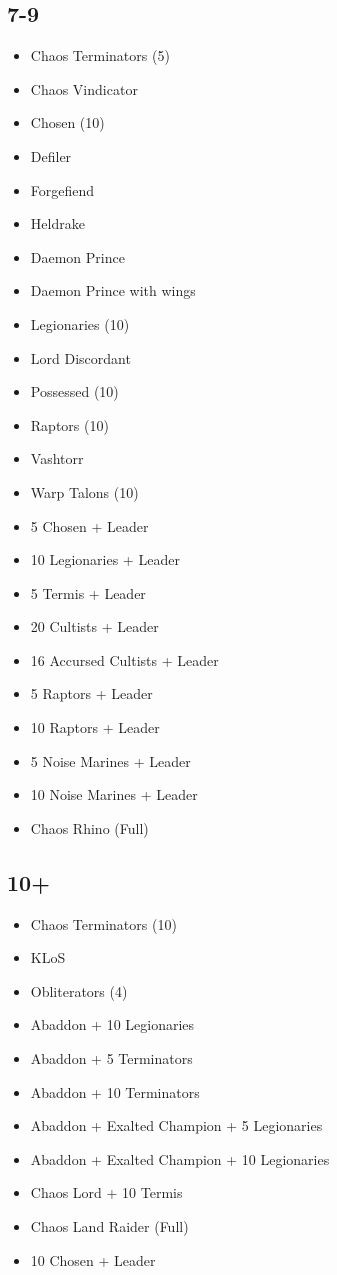 \documentclass{HordeModeTarot}
\begin{document}
\begin{multicols}{2}
\subsection*{7-9}

\begin{itemize}[leftmargin=*]
\item[] Chaos Terminators (5)
\item[] Chaos Vindicator
\item[] Chosen (10)
\item[] Defiler
\item[] Forgefiend
\item[] Heldrake
\item[] Daemon Prince
\item[] Daemon Prince with wings
\item[] Legionaries (10)
\item[] Lord Discordant
\item[] Possessed (10)
\item[] Raptors (10)
\item[] Vashtorr
\item[] Warp Talons (10)
\item[] 5 Chosen + Leader
\item[] 10 Legionaries + Leader
\item[] 5 Termis + Leader
\item[] 20 Cultists + Leader
\item[] 16 Accursed Cultists + Leader
\item[] 5 Raptors + Leader
\item[] 10 Raptors + Leader
\item[] 5 Noise Marines + Leader
\item[] 10 Noise Marines + Leader
\item[] Chaos Rhino (Full)
\end{itemize}

\subsection*{10+}

\begin{itemize}[leftmargin=*]
\item[] Chaos Terminators (10)
\item[] KLoS
\item[] Obliterators (4)
\item[] Abaddon + 10 Legionaries
\item[] Abaddon + 5 Terminators
\item[] Abaddon + 10 Terminators
\item[] Abaddon + Exalted Champion + 5 Legionaries
\item[] Abaddon + Exalted Champion + 10 Legionaries
\item[] Chaos Lord + 10 Termis
\item[] Chaos Land Raider (Full)
\item[] 10 Chosen + Leader
\end{itemize}


\end{multicols}
\end{document}
